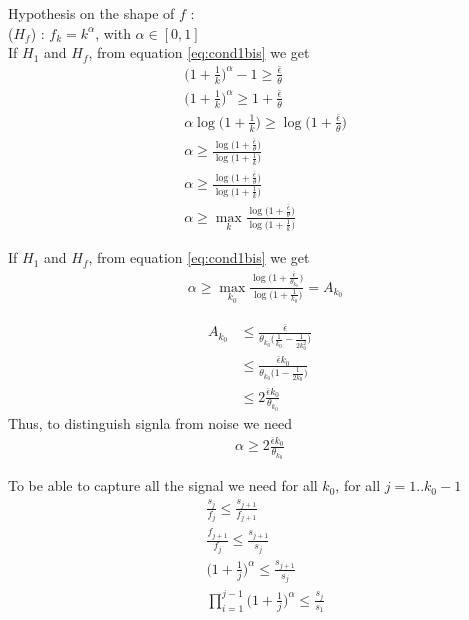 \documentclass{article}
\begin{document}
Hypothesis on the shape of $f$ :\\
($H_f$) : $f_k=k^{\alpha}$, with $\alpha\in [0,1]$\\

If $H_1$ and $H_f$, from equation \ref{eq:cond1bis} we get
\begin{align}
&\big(1+\frac{1}{k}\big)^{\alpha}-1 \geq \frac{\bar{\epsilon}}{\theta} \\
&\big(1+\frac{1}{k}\big)^{\alpha} \geq 1+\frac{\bar{\epsilon}}{\theta} \\
&\alpha\log\big(1+\frac{1}{k}\big) \geq \log\big(1+\frac{\bar{\epsilon}}{\theta}\big) \\
&\alpha \geq \frac{\log\big(1+\frac{\bar{\epsilon}}{\theta}\big)}{\log\big(1+\frac{1}{k}\big)} \\
&\alpha \geq \frac{\log\big(1+\frac{\bar{\epsilon}}{\theta}\big)}{\log\big(1+\frac{1}{k}\big)} \\
&\alpha \geq \max_{k} \frac{\log\big(1+\frac{\bar{\epsilon}}{\theta}\big)}{\log\big(1+\frac{1}{k}\big)} 
\end{align}

If $H_1$ and $H_f$, from equation \ref{eq:cond1bis} we get
\begin{align}
&\alpha \geq \max_{k_0} \frac{\log\big(1+\frac{\bar{\epsilon}}{\theta_{k_0}}\big)}{\log\big(1+\frac{1}{k_0}\big)}=A_{k_0} 
\end{align}

\begin{align}
A_{k_0} &\leq \frac{\bar{\epsilon}}{\theta_{k_0}\big(\frac{1}{k_0}-\frac{1}{2k_0^2}\big)}\\
  &\leq \frac{\bar{\epsilon}k_0}{\theta_{k_0}\big(1-\frac{1}{2k_0}\big)}\\
    &\leq 2\frac{\bar{\epsilon}k_0}{\theta_{k_0}}
\end{align}
Thus, to distinguish signla from noise we need
\begin{align}
\alpha\geq 2\frac{\bar{\epsilon}k_0}{\theta_{k_0}}
\end{align}

To be able to capture all the signal we need for all $k_0$, for all $j=1..k_0-1$
\begin{align}
&\frac{s_j}{f_j}\leq\frac{s_{j+1}}{f_{j+1}}\\
&\frac{f_{j+1}}{f_j}\leq\frac{s_{j+1}}{s_j}\\
&\big(1+\frac{1}{j}\big)^{\alpha}\leq\frac{s_{j+1}}{s_j}\\
&\prod_{i=1}^{j-1}\big(1+\frac{1}{j}\big)^{\alpha}\leq\frac{s_{j}}{s_1}\\
\end{align}
\end{document}

